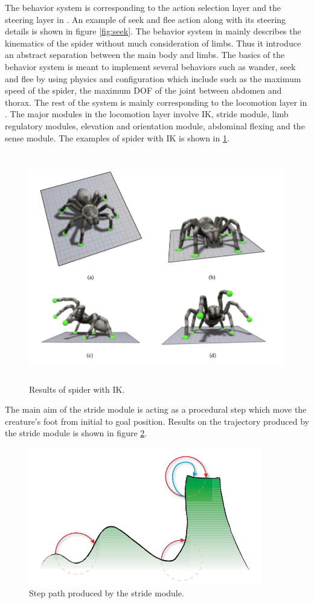 The behavior system is corresponding to the action selection layer and the steering layer in \cite{steering}. An example of seek and flee action along with its steering details is shown in figure \ref{fig:seek}. The behavior system in \cite{thesis} mainly describes the kinematics of the spider without much consideration of limbs. Thus it introduce an abstract separation between the main body and limbs. The basics of the behavior system is meant to implement several behaviors such as wander, seek and flee by using physics and configuration which include such as the maximum speed of the spider, the maximum DOF of the joint between abdomen and thorax.
The rest of the system is mainly corresponding to the locomotion layer in \cite{steering}.
The major modules in the locomotion layer involve IK, stride module, limb regulatory modules, elevation and orientation module, abdominal flexing and the sense module. The examples of spider with IK is shown in \ref{fig:spiderIK}.
\begin{figure}[ht!]
\centering
\includegraphics[height=10cm]{figures/spiderIK.png}
\caption{Results of spider with IK. \protect\cite{thesis}}
\label{fig:spiderIK}
\end{figure}
The main aim of the stride module is acting as a procedural step which move the creature's foot from initial to goal position. Results on the trajectory produced by the stride module is shown in figure \ref{fig:stride}.
\begin{figure}[ht!]
\centering
\includegraphics[height=6cm]{figures/stride.png}
\caption{Step path produced by the stride module. \protect\cite{thesis}}
\label{fig:stride}
\end{figure}
